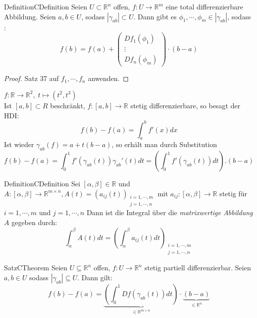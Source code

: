 %
%
\begin{ibox}[38]{Definition}{CDefinition}
    Seien $ U \subset \mathbb{R}^n  $ offen, $ f: U \to \mathbb{R}^m  $ eine total differenzierbare Abbildung. Seien
	$ a, b \in U $, sodass $ \left| \gamma _{ab} \right|  \subset U $. Dann gibt es $ \phi_1 , \cdots, \phi_{m} 
	\in \left| \gamma_{ab} \right| $, sodass :
	$$ f \left( b \right) = f \left( a \right) + \begin{pmatrix}
		Df_1( \phi_1) \\
		\vdots \\
		Df_{n}(\phi_{m})
	\end{pmatrix} \cdot (b-a)
	 $$
\end{ibox}
\begin{proof}
	Satz 37 auf $ f_1 , \cdots, f_{n} $ anwenden. 
\end{proof}
$ f: \mathbb{R} \to \mathbb{R}^{2}, \; t \mapsto (t^{2}, t^{3}) $ 
\\
Ist $ [a,b] \subset R $ beschränkt, $ f:[a,b] \to \mathbb{R}  $ stetig differenzierbare, so besagt der HDI:%
$$ f(b) - f(a) = \int_{a}^{b} f'(x) dx $$
Ist wieder $ \gamma_{ab}(f) = a + t(b-a) $, so erhält man durch Substitution 
$$ f(b) - f(a) = \int_0^{1} f'( \gamma_{ab}(t)) \gamma_{ab}'(t) dt = \left( \int_0^{1} f' \left( \gamma _{ab} (t) 
\right) dt \right) .(b-a) $$
\begin{ibox}[]{Definition}{CDefinition}
    Sei $ \left[ \alpha , \beta  \right] \in  \mathbb{R}  $ und  $ A: \left[ \alpha , \beta  \right] \to 
	\mathbb{R} ^{m \times n}, A(t) = \left( a_{ij}(t) \right)_{ \substack{ i = 1 , \cdots, m \\ j = 1 , \cdots, n }}$ 
	mit $ a_{ij}: \left[ \alpha , \beta  \right] \to \mathbb{R}  $ stetig für $ i = 1 , \cdots, m \text{ und }  j=1 , \cdots, n $ Dann ist die Integral über die \textit{matrixwertige Abbildung} $ A $ gegeben durch:
$$ \int_{ \alpha }^{ \beta }A(t) dt = \left( \int_{ \alpha }^{ \beta } a_{ij}(t) dt \right)_{\substack{ i=1 , \cdots, m \\
j = 1 , \cdots, n}} $$
\end{ibox}
\begin{ibox}[39]{Satz}{CTheorem}
    Seien $ U \subseteq \mathbb{R}^n  $ offen, $ f: U \to \mathbb{R}^n  $ stetig partiell differenzierbar. Seien 
	$ a,b \in U $ sodass $ \left| \gamma _{ab} \right| \subseteq U $. Dann gilt: 
	$$ f(b) - f(a) = \underbrace{ \left( \int_0^1 Df \left( \gamma _{ab} (t)  \right) dt \right)  }_{ \in \mathbb{R}^{
	m \times n}} \cdot \underbrace{ (b-a)}_{ \in \mathbb{R}^n } $$
\end{ibox}
